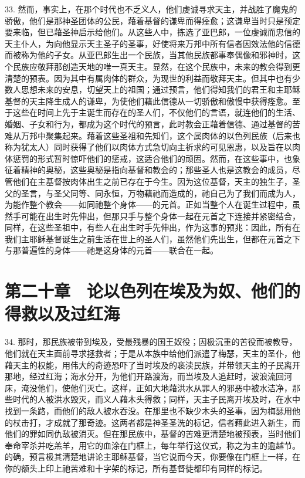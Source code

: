 33. 然而，事实上，在那个时代也不乏义人，他们虔诚寻求天主，并战胜了魔鬼的骄傲，他们是那神圣团体的公民，藉着基督的谦卑而得痊愈；这谦卑当时只是预定要来临，但已藉圣神启示给他们。从这些人中，拣选了亚巴郎，一位虔诚而忠信的天主仆人，为向他显示天主圣子的圣事，好使将来万邦中所有信者因效法他的信德而被称为他的子女。从亚巴郎生出一个民族，当其他民族都事奉偶像和邪神时，这个民族应敬拜那创造天地的唯一真天主。显然，在这个民族中，未来的教会得到更清楚的预表。因为其中有属肉体的群众，为现世的利益而敬拜天主。但其中也有少数人思想未来的安息，切望天上的祖国；通过预言，他们得知我们的君王和主耶稣基督的天主降生成人的谦卑，为使他们藉此信德从一切骄傲和傲慢中获得痊愈。至于这些在时间上先于主诞生而存在的圣人们，不仅他们的言语，就连他们的生活、婚姻、子女和行为，都成为这个时代的预言，此时教会正藉着信德、通过基督的苦难从万邦中聚集起来。藉着这些圣祖和先知们，这个属肉体的以色列民族（后来也称为犹太人）同时获得了他们以肉体方式急切向主祈求的可见恩惠，以及旨在以肉体惩罚的形式暂时惊吓他们的惩戒，这适合他们的顽固。然而，在这些事中，也象征着精神的奥秘，这些奥秘是指向基督和教会的；那些圣人也是这教会的成员，尽管他们在主基督按肉体出生之前已存在于今生。因为这位基督，天主的独生子，圣父的圣言，与圣父同等、同永恒，万物藉祂而造成的，祂自己为了我们而成为人，为能作整个教会——如同祂整个身体——的元首。正如当整个人在诞生过程中，虽然手可能在出生时先伸出，但那只手与整个身体一起在元首之下连接并紧密结合，同样，在这些圣祖中，有些人在出生时手先伸出，作为这事的预兆：因此，所有在我们主耶稣基督诞生之前生活在世上的圣人们，虽然他们先出生，但都在元首之下与那普遍性的身体——祂是这身体的元首——联合在一起。\par


\section{第二十章　论以色列在埃及为奴、他们的得救以及过红海}

34. 那时，那民族被带到埃及，受最残暴的国王奴役；因极沉重的苦役而被教导，他们就在天主面前寻求拯救者；于是从本族中给他们派遣了梅瑟，天主的圣仆，他藉天主的权能，用伟大的奇迹恐吓了当时埃及的亵渎民族，并带领天主的子民离开那地，经过红海；海水分开，为他们开路渡海，而当埃及人追赶时，波浪流回河床，淹没他们，使他们灭亡。这样，正如大地藉洪水从罪人的邪恶中被水洁净，那些时代的人被洪水毁灭，而义人藉木头得救；同样，天主子民离开埃及时，在水中找到一条路，而他们的敌人被水吞没。在那里也不缺少木头的圣事，因为梅瑟用他的杖击打，才成就了那奇迹。这两者都是神圣圣洗的标记，信者藉此进入新生，而他们的罪如同仇敌被消灭。但在那民族中，基督的苦难更清楚地被预表，当时他们奉命宰杀并吃羔羊，用它的血涂在门框上，每年举行这仪式，称之为主的逾越节。的确，预言极其清楚地讲论主耶稣基督，当它说而今天，你要像在门框上一样，在你的额头上印上祂苦难和十字架的标记，所有基督徒都印有同样的标记。\par

